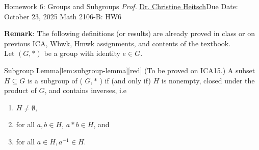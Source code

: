 \newpage{}
{Homework 6: Groups and Subgroups}
{\textit{Prof.} \href{https://ceheitsch.github.io/webpage/}{Dr. Christine Heitsch}}{Due Date: October 23, 2025}
{Math 2106-B: HW6}


\newpage
\textbf{Remark}: The following definitions (or results) are already proved in class or on previous ICA, 
Wbwk, Hmwk assignments, and contents of the textbook.\\
Let $(G, *)$ be a group with identity $e \in G$.
\begin{define}{Subgroup Lemma}[lem:subgroup-lemma][red]
  (To be proved on ICA15.) A subset $H \subseteq G$ is a subgroup of ( $G, *$ ) if (and only if) 
  $H$ is nonempty, closed under the product of $G$, and contains inverses, i.e 
  \begin{enumerate}
    \item $H \neq \emptyset$,
    \item for all $a, b \in H$, $a * b \in H$, and
    \item for all $a \in H, a^{-1} \in H$.
  \end{enumerate}
\end{define}
\newpage
